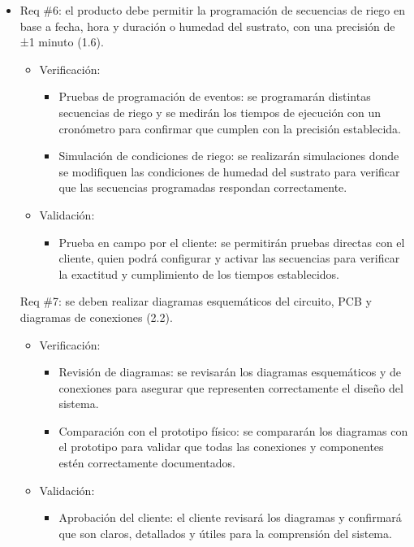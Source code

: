 \documentclass[
11pt, %
]{charter}
\begin{document}
\begin{itemize}
\item Req \#6: el producto debe permitir la programación de secuencias de riego en base a fecha, hora y duración o humedad del sustrato, con una precisión de ±1 minuto (1.6).
\begin{itemize}
    \item Verificación:
    \begin{itemize}
        \item Pruebas de programación de eventos: se programarán distintas secuencias de riego y se medirán los tiempos de ejecución con un cronómetro para confirmar que cumplen con la precisión establecida.
        \item Simulación de condiciones de riego: se realizarán simulaciones donde se modifiquen las condiciones de humedad del sustrato para verificar que las secuencias programadas respondan correctamente.
    \end{itemize}
    \item Validación:
    \begin{itemize}
        \item Prueba en campo por el cliente: se permitirán pruebas directas con el cliente, quien podrá configurar y activar las secuencias para verificar la exactitud y cumplimiento de los tiempos establecidos.
    \end{itemize}
\end{itemize}

Req \#7: se deben realizar diagramas esquemáticos del circuito, PCB y diagramas de conexiones (2.2).
\begin{itemize}
    \item Verificación:
    \begin{itemize}
        \item Revisión de diagramas: se revisarán los diagramas esquemáticos y de conexiones para asegurar que representen correctamente el diseño del sistema.
        \item Comparación con el prototipo físico: se compararán los diagramas con el prototipo para validar que todas las conexiones y componentes estén correctamente documentados.
    \end{itemize}
    \item Validación:
    \begin{itemize}
        \item Aprobación del cliente: el cliente revisará los diagramas y confirmará que son claros, detallados y útiles para la comprensión del sistema.
    \end{itemize}
\end{itemize}


\end{itemize}
\end{document}
